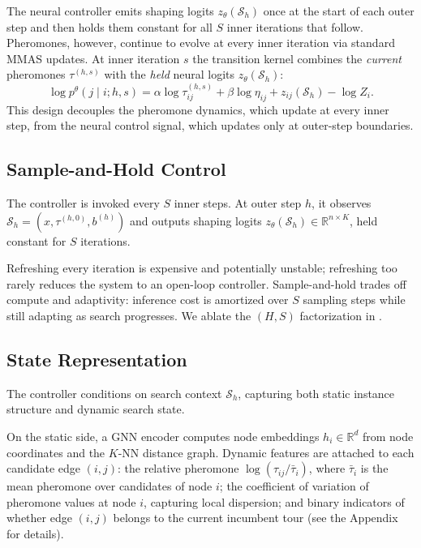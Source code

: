 \documentclass[sigconf,anonymous,review]{acmart}
\theoremstyle{definition}
\theoremstyle{plain}
\newcommand{\R}{\mathbb{R}}
\newcommand{\MMAS}{\textsc{MMAS}}
\begin{document}
The neural controller emits shaping logits $z_\theta(\mathcal{S}_h)$ once at the start of each outer step and then holds them constant for all $S$ inner iterations that follow.
Pheromones, however, continue to evolve at every inner iteration via standard \MMAS{} updates.
At inner iteration $s$ the transition kernel combines the \emph{current} pheromones $\tau^{(h,s)}$ with the \emph{held} neural logits $z_\theta(\mathcal{S}_h)$:
\begin{equation}
\log p^\theta(j \mid i; h, s) = \alpha \log \tau^{(h,s)}_{ij} + \beta \log \eta_{ij} + z_{ij}(\mathcal{S}_h) - \log Z_i.
\label{eq:held-logits}
\end{equation}
This design decouples the pheromone dynamics, which update at every inner step, from the neural control signal, which updates only at outer-step boundaries.

\subsection{Sample-and-Hold Control}
\label{sec:process}
The controller is invoked every $S$ inner steps.
At outer step $h$, it observes $\mathcal{S}_h = (x, \tau^{(h,0)}, b^{(h)})$ and outputs shaping logits $z_\theta(\mathcal{S}_h) \in \R^{n\times K}$, held constant for $S$ iterations.

Refreshing every iteration is expensive and potentially unstable; refreshing too rarely reduces the system to an open-loop controller.
Sample-and-hold trades off compute and adaptivity: inference cost is amortized over $S$ sampling steps while still adapting as search progresses.
We ablate the $(H, S)$ factorization in .


\subsection{State Representation}
\label{sec:state}
The controller conditions on search context $\mathcal{S}_h$, capturing both static instance structure and dynamic search state.

On the static side, a GNN encoder computes node embeddings $h_i \in \R^d$ from node coordinates and the $K$-NN distance graph.
Dynamic features are attached to each candidate edge $(i, j)$: the relative pheromone $\log(\tau_{ij} / \bar{\tau}_i)$, where $\bar{\tau}_i$ is the mean pheromone over candidates of node $i$; the coefficient of variation of pheromone values at node $i$, capturing local dispersion; and binary indicators of whether edge $(i,j)$ belongs to the current incumbent tour (see the Appendix for details).
\end{document}
